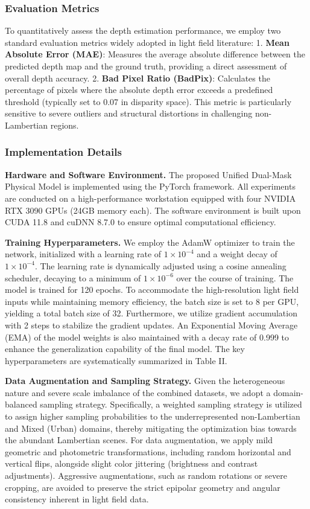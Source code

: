 \subsubsection{Evaluation Metrics}

To quantitatively assess the depth estimation performance, we employ two standard evaluation metrics widely adopted in light field literature:
1. \textbf{Mean Absolute Error (MAE)}: Measures the average absolute difference between the predicted depth map and the ground truth, providing a direct assessment of overall depth accuracy.
2. \textbf{Bad Pixel Ratio (BadPix)}: Calculates the percentage of pixels where the absolute depth error exceeds a predefined threshold (typically set to 0.07 in disparity space). This metric is particularly sensitive to severe outliers and structural distortions in challenging non-Lambertian regions.

\subsubsection{Implementation Details}

\textbf{Hardware and Software Environment.} 
The proposed Unified Dual-Mask Physical Model is implemented using the PyTorch framework. All experiments are conducted on a high-performance workstation equipped with four NVIDIA RTX 3090 GPUs (24GB memory each). The software environment is built upon CUDA 11.8 and cuDNN 8.7.0 to ensure optimal computational efficiency.

\textbf{Training Hyperparameters.} 
We employ the AdamW optimizer to train the network, initialized with a learning rate of $1 \times 10^{-4}$ and a weight decay of $1 \times 10^{-4}$. The learning rate is dynamically adjusted using a cosine annealing scheduler, decaying to a minimum of $1 \times 10^{-6}$ over the course of training. The model is trained for 120 epochs. To accommodate the high-resolution light field inputs while maintaining memory efficiency, the batch size is set to 8 per GPU, yielding a total batch size of 32. Furthermore, we utilize gradient accumulation with 2 steps to stabilize the gradient updates. An Exponential Moving Average (EMA) of the model weights is also maintained with a decay rate of 0.999 to enhance the generalization capability of the final model. The key hyperparameters are systematically summarized in Table II.

\textbf{Data Augmentation and Sampling Strategy.} 
Given the heterogeneous nature and severe scale imbalance of the combined datasets, we adopt a domain-balanced sampling strategy. Specifically, a weighted sampling strategy is utilized to assign higher sampling probabilities to the underrepresented non-Lambertian and Mixed (Urban) domains, thereby mitigating the optimization bias towards the abundant Lambertian scenes. For data augmentation, we apply mild geometric and photometric transformations, including random horizontal and vertical flips, alongside slight color jittering (brightness and contrast adjustments). Aggressive augmentations, such as random rotations or severe cropping, are avoided to preserve the strict epipolar geometry and angular consistency inherent in light field data.

